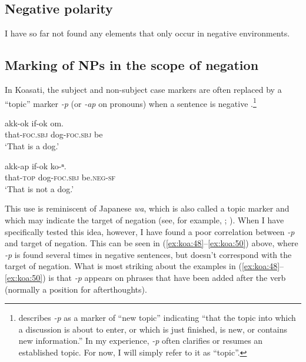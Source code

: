 \documentclass[output=paper,colorlinks,citecolor=brown]{langscibook}
\begin{document}
\subsection{Negative polarity}\label{sec:koa:4.2}

I have so far not found any elements that only occur in negative environments.

\subsection{Marking of NPs in the scope of negation}\label{sec:koa:4.3}

In Koasati, the subject and non-subject case markers are often replaced by a “topic” marker \textit{-p} (or \textit{-ap} on pronouns) when a sentence is negative .\footnote{\citet[411]{Kimball1991} describes \textit{{}-p} as a marker of “new topic” indicating “that the topic into which a discussion is about to enter, or which is just finished, is new, or contains new information.” In my experience, \textit{{}-p} often clarifies or resumes an established topic. For now, I will simply refer to it as “topic”.}


\ea\label{ex:koa:60}
    \ea\label{ex:koa:60a}
        \gll akk-ok  if-ok  om. \\ 
              that-\textsc{foc}.\textsc{sbj}  dog-\textsc{foc}.\textsc{sbj}  be \\
        \glt ‘That is a dog.’
    
    \ex\label{ex:koa:60b}
        \gll akk-ap  if-ok  ko-ⁿ.\\
             that-\textsc{top}  dog-\textsc{foc}.\textsc{sbj}  be.\textsc{neg}-\textsc{sf} \\
        \glt ‘That is not a dog.’
    \z
\z 

This use is reminiscent of Japanese \textit{wa}, which is also called a topic marker and which may indicate the target of negation (see, for example, \citealt[149ff]{Hinds1986}; \citealt[45--46]{Nyberg2012}). When I have specifically tested this idea, however, I have found a poor correlation between \textit{-p} and target of negation. This can be seen in (\ref{ex:koa:48}--\ref{ex:koa:50}) above, where \textit{-p} is found several times in negative sentences, but doesn’t correspond with the target of negation. What is most striking about the examples in (\ref{ex:koa:48}--\ref{ex:koa:50}) is that \textit{-p} appears on phrases that have been added after the verb (normally a position for afterthoughts).
\end{document}
